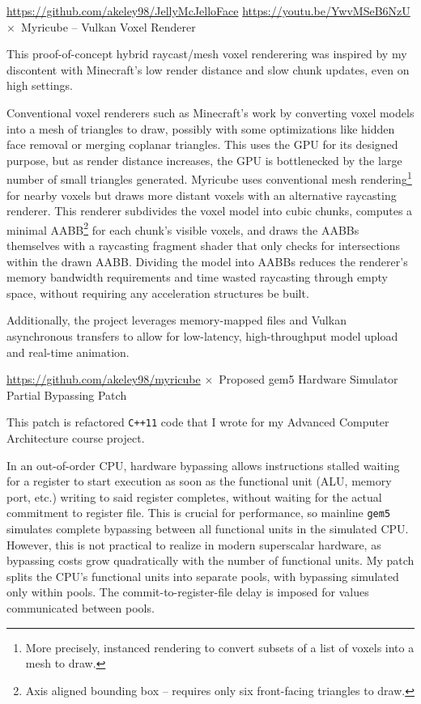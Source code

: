 \documentclass[11pt]{article}
\newcommand{\web}[1]{{\color{webColor} \small \url{#1}}}
\newcommand{\mySub}[1]{{\color{subColor}\hspace{-6mm} \( \times \)\ \textsf{#1}}}
\newcommand{\lighttt}[1]{{\color{lightttColor}\texttt{#1}}}
\begin{document}
\web{https://github.com/akeley98/JellyMcJelloFace}
\hfill\web{https://youtu.be/YwvMSeB6NzU}
\filbreak
\mySub{Myricube -- Vulkan Voxel Renderer}

This proof-of-concept hybrid raycast/mesh voxel renderering was
inspired by my discontent with Minecraft's low render distance and
slow chunk updates, even on high settings.

Conventional voxel renderers such as Minecraft's work by converting
voxel models into a mesh of triangles to draw, possibly with some
optimizations like hidden face removal or merging coplanar
triangles. This uses the GPU for its designed purpose, but as render
distance increases, the GPU is bottlenecked by the large number of
small triangles generated. Myricube uses conventional mesh
rendering\footnote{More precisely, instanced rendering to convert
subsets of a list of voxels into a mesh to draw.} for nearby voxels
but draws more distant voxels with an alternative raycasting
renderer. This renderer subdivides the voxel model into cubic chunks,
computes a minimal AABB\footnote{Axis aligned bounding box -- requires
only six front-facing triangles to draw.} for each chunk's visible
voxels, and draws the AABBs themselves with a raycasting fragment
shader that only checks for intersections within the drawn AABB.
Dividing the model into AABBs reduces the renderer's memory bandwidth
requirements and time wasted raycasting through empty space, without
requiring any acceleration structures be built.

Additionally, the project leverages memory-mapped files and Vulkan
asynchronous transfers to allow for low-latency, high-throughput model
upload and real-time animation.

\web{https://github.com/akeley98/myricube}
\filbreak
\mySub{Proposed gem5 Hardware Simulator Partial Bypassing Patch}

This patch is refactored \lighttt{C++11} code that I wrote for my
Advanced Computer Architecture course project.

In an out-of-order CPU, hardware bypassing allows instructions stalled
waiting for a register to start execution as soon as the functional
unit (ALU, memory port, etc.) writing to said register completes,
without waiting for the actual commitment to register file. This is
crucial for performance, so mainline \lighttt{gem5} simulates complete
bypassing between all functional units in the simulated CPU. However,
this is not practical to realize in modern superscalar hardware, as
bypassing costs grow quadratically with the number of functional
units. My patch splits the CPU's functional units into separate pools,
with bypassing simulated only within pools. The
commit-to-register-file delay is imposed for values communicated
between pools.
\end{document}
